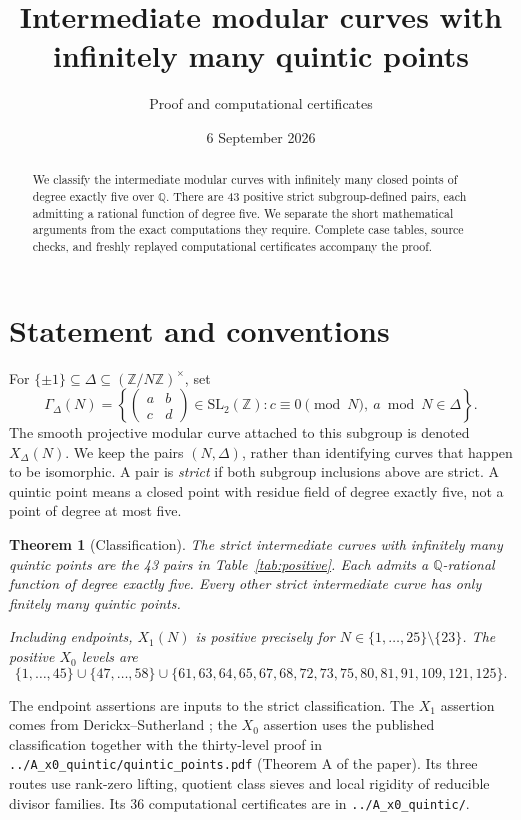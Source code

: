 \documentclass[11pt]{article}
\title{Intermediate modular curves with infinitely many quintic points}
\author{Proof and computational certificates}
\date{6 September 2026}
\newcommand{\Q}{\mathbb Q}
\newtheorem{theorem}{Theorem}
\theoremstyle{remark}\newtheorem{remark}[theorem]{Remark}
\begin{document}
\maketitle
\begin{abstract}
We classify the intermediate modular curves with infinitely many closed
points of degree exactly five over $\Q$. There are 43 positive strict
subgroup-defined pairs, each admitting a rational function of degree five.
We separate the short mathematical arguments from the exact computations
they require. Complete case tables, source checks, and freshly replayed
computational certificates accompany the proof.
\end{abstract}

\section{Statement and conventions}
For $\{\pm1\}\subseteq\Delta\subseteq(\mathbb Z/N\mathbb Z)^\times$, set
\[
 \Gamma_\Delta(N)=\left\{\begin{pmatrix}a&b\\c&d\end{pmatrix}
 \in\mathrm{SL}_2(\mathbb Z):c\equiv0\pmod N,\ a\bmod N\in\Delta\right\}.
\]
The smooth projective modular curve attached to this subgroup is denoted
$X_\Delta(N)$. We keep the pairs $(N,\Delta)$, rather than identifying
curves that happen to be isomorphic. A pair is \emph{strict} if both subgroup
inclusions above are strict. A quintic point means a closed point with
residue field of degree exactly five, not a point of degree at most five.

\begin{theorem}[Classification]
The strict intermediate curves with infinitely many quintic points are
the 43 pairs in Table~\ref{tab:positive}. Each admits a $\Q$-rational
function of degree exactly five. Every other strict intermediate curve
has only finitely many quintic points.

Including endpoints, $X_1(N)$ is positive precisely for
$N\in\{1,\ldots,25\}\setminus\{23\}$. The positive $X_0$ levels are
\[
 \{1,\ldots,45\}\cup\{47,\ldots,58\}\cup
 \{61,63,64,65,67,68,72,73,75,80,81,91,109,121,125\}.
\]
\end{theorem}

The endpoint assertions are inputs to the strict classification. The
$X_1$ assertion comes from Derickx--Sutherland \cite{DS}; the $X_0$ assertion uses
the published classification \cite[Theorem 1.10]{DHJO} together with the
thirty-level proof in \texttt{../A\_x0\_quintic/quintic\_points.pdf}
(Theorem A of the paper). Its three routes use rank-zero lifting, quotient
class sieves and local rigidity of reducible divisor families. Its 36
computational certificates are in \texttt{../A\_x0\_quintic/}.
\end{document}
